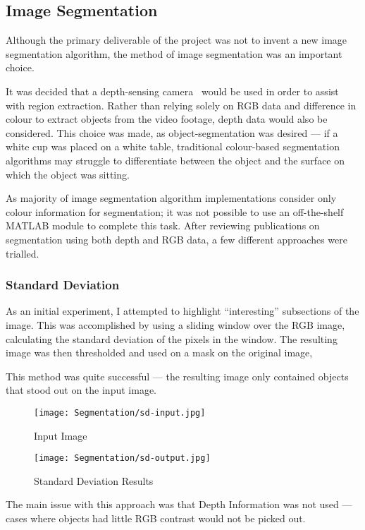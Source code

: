 \subsection{Image Segmentation}
Although the primary deliverable of the project was not to invent a new image segmentation algorithm, the method of image segmentation was an important choice.

It was decided that a depth-sensing camera~\cite{xtion} would be used in order to assist with region extraction. Rather than relying solely on RGB data and difference in colour to extract objects from the video footage, depth data would also be considered. This choice was made, as object-segmentation was desired --- if a white cup was placed on a white table, traditional colour-based segmentation algorithms may struggle to differentiate between the object and the surface on which the object was sitting.

As majority of image segmentation algorithm implementations consider only colour information for segmentation; it was not possible to use an off-the-shelf MATLAB module to complete this task. After reviewing publications on segmentation using both depth and RGB data, a few different approaches were trialled.

\subsubsection{Standard Deviation}
As an initial experiment, I attempted to highlight ``interesting'' subsections of the image. This was accomplished by using a sliding window over the RGB image, calculating the standard deviation of the pixels in the window. The resulting image was then thresholded and used on a mask on the original image,

This method was quite successful --- the resulting image only contained objects that stood out on the input image.

\begin{figure}[H]
    \centering
    \texttt{[image: Segmentation/sd-input.jpg]}
    \caption{Input Image}
\end{figure}

\begin{figure}[H]
   \centering
   \texttt{[image: Segmentation/sd-output.jpg]}
   \caption{Standard Deviation Results}

\end{figure}

The main issue with this approach was that Depth Information was not used --- cases where objects had little RGB contrast would not be picked out. 

